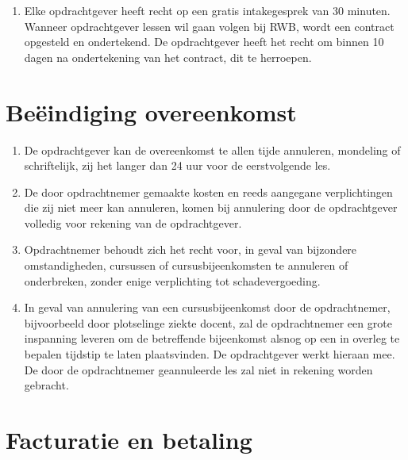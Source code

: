 \documentclass[a4paper]{article}
\begin{document}
\begin{enumerate}
	\item Elke opdrachtgever heeft recht op een gratis intakegesprek van 30 minuten. Wanneer opdrachtgever lessen wil gaan volgen bij RWB, wordt een contract opgesteld en ondertekend. De opdrachtgever heeft het recht om binnen 10 dagen na ondertekening van het contract, dit te herroepen.
\end{enumerate}

\section{Be\"eindiging overeenkomst}

\begin{enumerate}
	\item De opdrachtgever kan de overeenkomst te allen tijde annuleren, mondeling of schriftelijk, zij het langer dan 24 uur voor de eerstvolgende les.
	\item De door opdrachtnemer gemaakte kosten en reeds aangegane verplichtingen die zij niet meer kan annuleren, komen bij annulering door de opdrachtgever volledig voor rekening van de opdrachtgever.
	\item Opdrachtnemer behoudt zich het recht voor, in geval van bijzondere omstandigheden, cursussen of cursusbijeenkomsten te annuleren of onderbreken, zonder enige verplichting tot schadevergoeding.
	\item In geval van annulering van een cursusbijeenkomst door de opdrachtnemer, bijvoorbeeld door plotselinge ziekte docent, zal de opdrachtnemer een grote inspanning leveren om de betreffende bijeenkomst alsnog op een in overleg te bepalen tijdstip te laten plaatsvinden. De opdrachtgever werkt hieraan mee. De door de opdrachtnemer geannuleerde les zal niet in rekening worden gebracht.
\end{enumerate}

\section{Facturatie en betaling}
\end{document}
